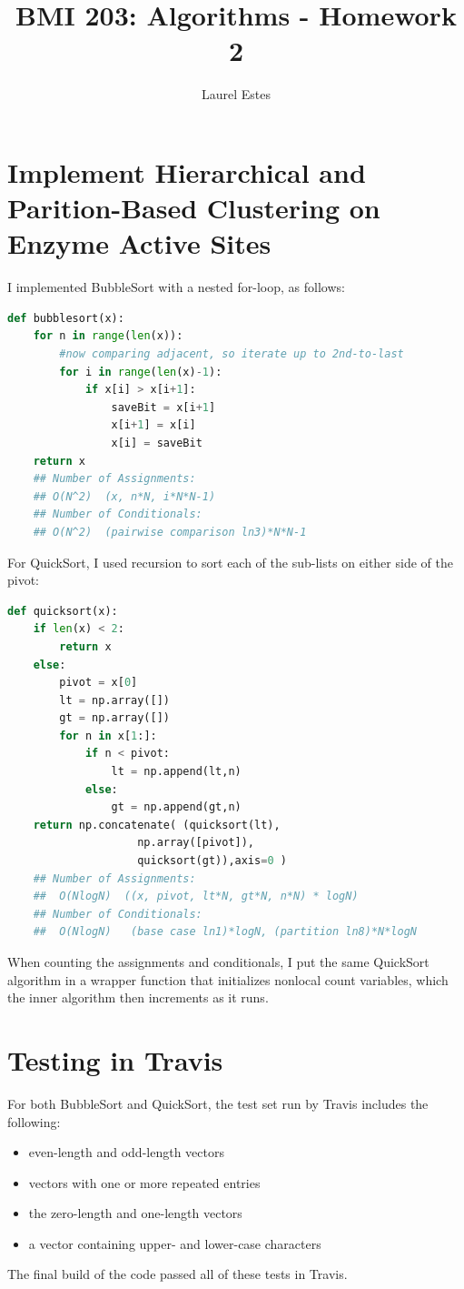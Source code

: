 \documentclass{article}
\begin{document}
\title{BMI 203: Algorithms - Homework 2}
\author{Laurel Estes}
\maketitle
\section{Implement Hierarchical and Parition-Based Clustering on Enzyme Active Sites}

I implemented BubbleSort with a nested for-loop, as follows:
\begin{lstlisting}[language=Python]
def bubblesort(x):
    for n in range(len(x)):
    	#now comparing adjacent, so iterate up to 2nd-to-last
        for i in range(len(x)-1): 
            if x[i] > x[i+1]:
                saveBit = x[i+1]
                x[i+1] = x[i]
                x[i] = saveBit
    return x
    ## Number of Assignments:
    ## O(N^2)  (x, n*N, i*N*N-1)
    ## Number of Conditionals:
    ## O(N^2)  (pairwise comparison ln3)*N*N-1
\end{lstlisting}
\vspace{0.5cm}
For QuickSort, I used recursion to sort each of the sub-lists on either side of the pivot:
\begin{lstlisting}[language=python]
def quicksort(x):
    if len(x) < 2:
        return x
    else:
        pivot = x[0]
        lt = np.array([])
        gt = np.array([])
        for n in x[1:]:
            if n < pivot:
                lt = np.append(lt,n)
            else:
                gt = np.append(gt,n)
    return np.concatenate( (quicksort(lt),
    				np.array([pivot]),
    				quicksort(gt)),axis=0 )
    ## Number of Assignments:
    ##  O(NlogN)  ((x, pivot, lt*N, gt*N, n*N) * logN)
    ## Number of Conditionals:
    ##  O(NlogN)   (base case ln1)*logN, (partition ln8)*N*logN
\end{lstlisting}
\vspace{0.5cm}
When counting the assignments and conditionals, I put the same QuickSort algorithm in a wrapper function that initializes nonlocal count variables, which the inner algorithm then increments as it runs.

\section{Testing in Travis}
For both BubbleSort and QuickSort, the test set run by Travis includes the following:
\begin{itemize}
	\item even-length and odd-length vectors
	\item vectors with one or more repeated entries
	\item the zero-length and one-length vectors
	\item a vector containing upper- and lower-case characters
\end{itemize}
The final build of the code passed all of these tests in Travis.
\end{document}
